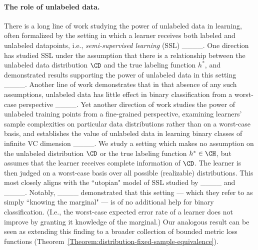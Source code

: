 \paragraph{The role of unlabeled data.} There is a long line of work studying the power of unlabeled data in learning, often formalized by the setting in which a learner receives both labeled and unlabeled datapoints, i.e., \emph{semi-supervised learning} (SSL) ____. One direction has studied SSL under the assumption that there is a relationship between the unlabeled data distribution $\CD$ and the true labeling function $h^*$, and demonstrated results supporting the power of unlabeled data in this setting ____. Another line of work demonstrates that in that absence of any such assumptions, unlabeled data has little effect in binary classification from a worst-case perspective ____. Yet another direction of work studies the power of unlabeled training points from a fine-grained perspective, examining learners' sample complexities on particular data distributions rather than on a worst-case basis, and establishes the value of unlabeled data in learning binary classes of infinite VC dimension ____.
We study a setting which makes no assumption on the unlabeled distribution $\CD$ or the true labeling function $h^* \in \CH$, but assumes that the learner receives complete information of $\CD$. The learner is then judged on a worst-case basis over all possible (realizable) distributions. This most closely aligns with the ``utopian" model of SSL studied by ____ and ____. Notably, ____ demonstrated that this setting --- which they refer to as simply ``knowing the marginal" --- is of no additional help for binary classification. (I.e., the worst-case expected error rate of a learner does not improve by granting it knowledge of the marginal.) Our analogous result can be seen as extending this finding to a broader collection of bounded metric loss functions (Theorem~\ref{Theorem:distribution-fixed-sample-equivalence}).

